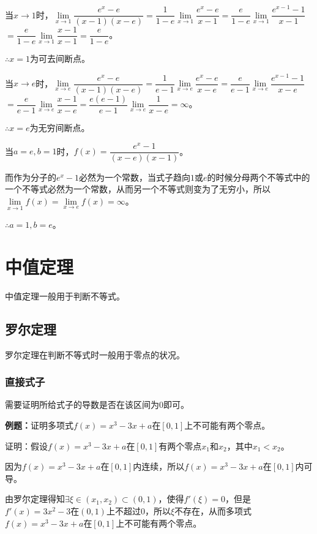 \documentclass[UTF8, 12pt]{ctexart}
\begin{document}
当$x\to 1$时，$\lim\limits_{x\to 1}\dfrac{e^x-e}{(x-1)(x-e)}$$=\dfrac{1}{1-e}\lim\limits_{x\to 1}\dfrac{e^x-e}{x-1}$$=\dfrac{e}{1-e}\lim\limits_{x\to 1}\dfrac{e^{x-1}-1}{x-1}$$=\dfrac{e}{1-e}\lim\limits_{x\to 1}\dfrac{x-1}{x-1}$$=\dfrac{e}{1-e}$。\medskip

$\therefore x=1$为可去间断点。\medskip

    当$x\to e$时，$\lim\limits_{x\to e}\dfrac{e^x-e}{(x-1)(x-e)}$$=\dfrac{1}{e-1}\lim\limits_{x\to e}\dfrac{e^x-e}{x-e}$$=\dfrac{e}{e-1}\lim\limits_{x\to e}\dfrac{e^{x-1}-1}{x-e}$\medskip$=\dfrac{e}{e-1}\lim\limits_{x\to e}\dfrac{x-1}{x-e}$$=\dfrac{e(e-1)}{e-1}\lim\limits_{x\to e}\dfrac{1}{x-e}=\infty$。\medskip

$\therefore x=e$为无穷间断点。\medskip

    当$a=e,b=1$时，$f(x)=\dfrac{e^x-1}{(x-e)(x-1)}$。\medskip

    而作为分子的$e^x-1$必然为一个常数，当式子趋向$1$或$e$的时候分母两个不等式中的一个不等式必然为一个常数，从而另一个不等式则变为了无穷小，所以$\lim\limits_{x\to 1}f(x)=\lim\limits_{x\to e}f(x)=\infty$。

$\therefore a=1,b=e$。

\section{中值定理}

中值定理一般用于判断不等式。

\subsection{罗尔定理}

罗尔定理在判断不等式时一般用于零点的状况。

\subsubsection{直接式子}

需要证明所给式子的导数是否在该区间为0即可。

\textbf{例题：}证明多项式$f(x)=x^3-3x+a$在$[0,1]$上不可能有两个零点。

证明：假设$f(x)=x^3-3x+a$在$[0,1]$有两个零点$x_1$和$x_2$，其中$x_1<x_2$。

因为$f(x)=x^3-3x+a$在$[0,1]$内连续，所以$f(x)=x^3-3x+a$在$[0,1]$内可导。

由罗尔定理得知$\exists\xi\in(x_1,x_2)\subset(0,1)$，使得$f'(\xi)=0$，但是$f'(x)=3x^2-3$在$(0,1)$上不超过0，所以$\xi$不存在，从而多项式$f(x)=x^3-3x+a$在$[0,1]$上不可能有两个零点。
\end{document}
